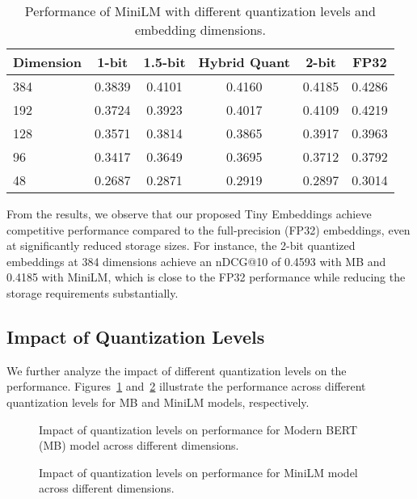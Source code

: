 \begin{table}[ht]
\caption{Performance of MiniLM with different quantization levels and embedding dimensions.}
\label{tab:minilm_main_results}
\centering
\begin{tabular}{lccccc}
\toprule
\textbf{Dimension} & \textbf{1-bit} & \textbf{1.5-bit} & \textbf{Hybrid Quant} & \textbf{2-bit} & \textbf{FP32} \\
\midrule
384 & 0.3839 & 0.4101 & 0.4160 & 0.4185 & 0.4286 \\
192 & 0.3724 & 0.3923 & 0.4017 & 0.4109 & 0.4219 \\
128 & 0.3571 & 0.3814 & 0.3865 & 0.3917 & 0.3963 \\
96 & 0.3417 & 0.3649 & 0.3695 & 0.3712 & 0.3792 \\
48 & 0.2687 & 0.2871 & 0.2919 & 0.2897 & 0.3014 \\
\bottomrule
\end{tabular}
\end{table}

From the results, we observe that our proposed Tiny Embeddings achieve competitive performance compared to the full-precision (FP32) embeddings, even at significantly reduced storage sizes. For instance, the 2-bit quantized embeddings at 384 dimensions achieve an nDCG@10 of 0.4593 with MB and 0.4185 with MiniLM, which is close to the FP32 performance while reducing the storage requirements substantially.

\subsection{Impact of Quantization Levels}

We further analyze the impact of different quantization levels on the performance. Figures~\ref{fig:quantization_impact_mb} and~\ref{fig:quantization_impact_minilm} illustrate the performance across different quantization levels for MB and MiniLM models, respectively.

\begin{figure}[ht]
    \centering
    \caption{Impact of quantization levels on performance for Modern BERT (MB) model across different dimensions.}
    \label{fig:quantization_impact_mb}
\end{figure}

\begin{figure}[ht]
    \centering
    \caption{Impact of quantization levels on performance for MiniLM model across different dimensions.}
    \label{fig:quantization_impact_minilm}
\end{figure}

